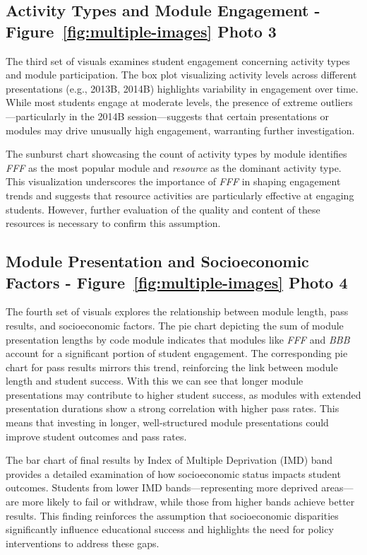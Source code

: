 \subsection*{Activity Types and Module Engagement - Figure~\ref{fig:multiple-images} Photo 3}

The third set of visuals examines student engagement concerning activity types and module participation. The box plot visualizing activity levels across different presentations (e.g., 2013B, 2014B) highlights variability in engagement over time. While most students engage at moderate levels, the presence of extreme outliers—particularly in the 2014B session—suggests that certain presentations or modules may drive unusually high engagement, warranting further investigation.

The sunburst chart showcasing the count of activity types by module identifies \textit{FFF} as the most popular module and \textit{resource} as the dominant activity type. This visualization underscores the importance of \textit{FFF} in shaping engagement trends and suggests that resource activities are particularly effective at engaging students. However, further evaluation of the quality and content of these resources is necessary to confirm this assumption.

\subsection*{Module Presentation and Socioeconomic Factors - Figure~\ref{fig:multiple-images} Photo 4}

The fourth set of visuals explores the relationship between module length, pass results, and socioeconomic factors. The pie chart depicting the sum of module presentation lengths by code module indicates that modules like \textit{FFF} and \textit{BBB} account for a significant portion of student engagement. The corresponding pie chart for pass results mirrors this trend, reinforcing the link between module length and student success. With this we can see that longer module presentations may contribute to higher student success, as modules with extended presentation durations show a strong correlation with higher pass rates. This means that investing in longer, well-structured module presentations could improve student outcomes and pass rates.

The bar chart of final results by Index of Multiple Deprivation (IMD) band provides a detailed examination of how socioeconomic status impacts student outcomes. Students from lower IMD bands—representing more deprived areas—are more likely to fail or withdraw, while those from higher bands achieve better results. This finding reinforces the assumption that socioeconomic disparities significantly influence educational success and highlights the need for policy interventions to address these gaps.

